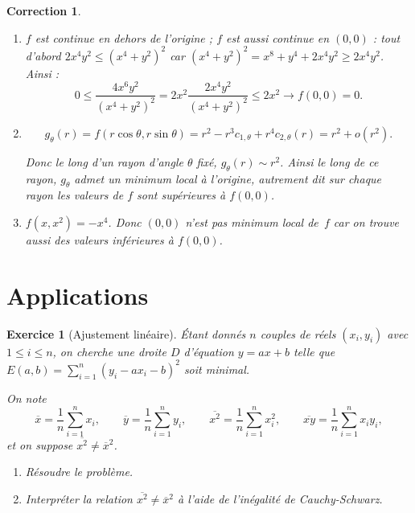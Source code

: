 \documentclass[11pt,a4paper]{article}
\renewcommand{\ge}{\geqslant} \renewcommand{\geq}{\geqslant}
\renewcommand{\le}{\leqslant} \renewcommand{\leq}{\leqslant}
\theoremstyle{exostyle}
\newtheorem{exo}{Exercice}
\newtheorem{cor}{Correction}
\newcommand{\exercice}[1]{} \newcommand{\finexercice}{}
\newcommand{\enonce}{\begin{exo}} \newcommand{\finenonce}{\end{exo}}
\newcommand{\correction}{\begin{cor}} \newcommand{\fincorrection}{\end{cor}}
\begin{document}
\correction
\begin{enumerate}
	\item $f$ est continue en dehors de l'origine ;
	$f$ est aussi continue en $(0,0)$ : 
	tout d'abord $2x^4y^2 \le (x^4+y^2)^2$ car $(x^4+y^2)^2 = x^8 + y^4 + 2x^4y^2 \ge 2x^4y^2$.
	Ainsi :
	\[
	0 \le \frac{4x^6y^2}{(x^4+y^2)^2} = 2x^2\frac{2x^4y^2}{(x^4+y^2)^2} \le 2x^2 \xrightarrow{} f(0,0) = 0.
	\]
	
	\item 
	
	\[
	g_\theta(r) = f(r\cos\theta,r\sin\theta) =  r^2 - r^3 c_{1,\theta} + r^4 c_{2,\theta}(r) 
	= r^2 +o(r^2).\]
	
	Donc le long d'un rayon d'angle $\theta$ fixé, $g_\theta(r) \sim r^2$. 
	Ainsi le long de ce rayon, $g_\theta$ admet un minimum local à l'origine, autrement dit sur chaque rayon les valeurs de $f$ sont supérieures à $f(0,0)$.
	
	
	\item $f(x,x^2)=-x^4$. Donc $(0,0)$ n'est pas minimum local de~$f$ car on trouve aussi des valeurs inférieures à $f(0,0)$.
\end{enumerate}


\fincorrection

\finexercice




\section{Applications}


\exercice{4159, quercia, 2010/03/11}
\enonce[Ajustement linéaire]

Étant donnés $n$ couples de réels  
$(x_i,y_i)$ avec $1 \le i \le n$,
on cherche une droite $D$ d'équation $y = ax+b$ telle que
$E(a,b) = \sum_{i=1}^n (y_i-ax_i-b)^2$ soit minimal.

On note
$$\overline  x    = \frac 1n \sum_{i=1}^n x_i,\qquad
\overline  y    = \frac 1n \sum_{i=1}^n y_i,\qquad
\overline {x^2} = \frac 1n \sum_{i=1}^n x_i^2,\qquad
\overline {xy} = \frac 1n \sum_{i=1}^n x_iy_i,$$
et on suppose $\overline {x^2} \ne \overline x^2$.

\begin{enumerate}
	\item Résoudre le problème.
	\item Interpréter la relation $\overline {x^2} \ne \overline x^2$
	à l'aide de l'inégalité de Cauchy-Schwarz.
\end{enumerate}
\finenonce
\end{document}
